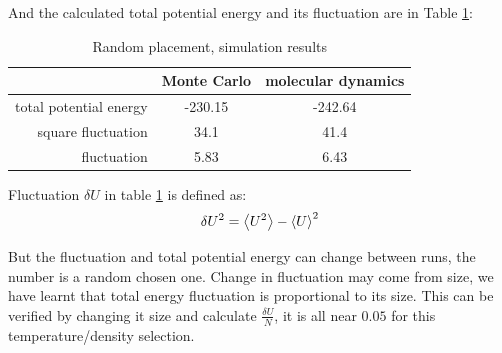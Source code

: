 \documentclass[UTF8,a4paper,no-math]{article}
\begin{document}
And the calculated total potential energy and its fluctuation are in Table \ref{tab:rand1}:
\begin{table}[H]
	\centering
	\caption{Random placement, simulation results}
	\begin{tabular}{rcc}
		\toprule
		\toprule
		                       & Monte Carlo & molecular dynamics \\ \midrule
		total potential energy & -230.15     & -242.64            \\
		square fluctuation     & 34.1        & 41.4               \\
		fluctuation            & 5.83        & 6.43               \\
		\bottomrule
	\end{tabular}%
	\label{tab:rand1}%
\end{table}%
Fluctuation $\delta U$ in table \ref{tab:rand1} is defined as:
\begin{equation}
	\delta U^{2}=\expval{U^2} - \expval{U}^2	\label{eq:flu}
\end{equation}

But the fluctuation and total potential energy can change between runs, the number is a random chosen one. Change in fluctuation may come from size,
we have learnt that total energy fluctuation is proportional to its size. This can be verified by changing it size and calculate $\frac{\delta U}{N}$,
it is all near $0.05$ for this temperature/density selection.
\end{document}
